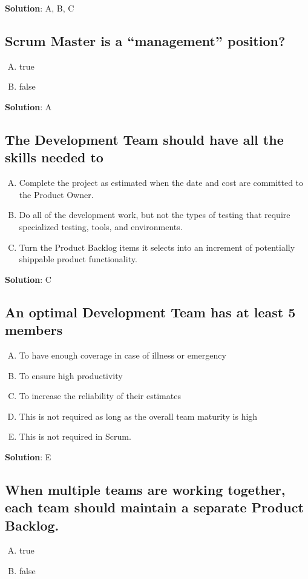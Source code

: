 \textbf{Solution}: A, B, C


\subsection{Scrum Master is a \enquote{management} position?}
\begin{enumerate}[A)]
  \item true
  \item false
\end{enumerate}


\textbf{Solution}: A


\subsection{The Development Team should have all the skills needed to}
\begin{enumerate}[A)]
  \item Complete the project as estimated when the date and cost are committed to the Product Owner.
  \item Do all of the development work, but not the types of testing that require specialized testing, tools, and environments.
  \item Turn the Product Backlog items it selects into an increment of potentially shippable product functionality.
\end{enumerate}


\textbf{Solution}: C


\subsection{An optimal Development Team has at least 5 members}
\begin{enumerate}[A)]
  \item To have enough coverage in case of illness or emergency
  \item To ensure high productivity
  \item To increase the reliability of their estimates
  \item This is not required as long as the overall team maturity is high
  \item This is not required in Scrum.
\end{enumerate}


\textbf{Solution}: E


\subsection{When multiple teams are working together, each team should maintain a separate Product Backlog.}
\begin{enumerate}[A)]
  \item true
  \item false
\end{enumerate}


